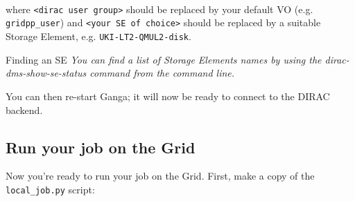 \begin{Shaded}
\begin{Highlighting}[]
\NormalTok{[}\NormalTok{]}
 

\NormalTok{[}\NormalTok{]}
 

\NormalTok{[}\NormalTok{]}
 

\NormalTok{[}\NormalTok{]}
 \NormalTok{= }\KeywordTok{<}\KeywordTok{>}

\NormalTok{[}\NormalTok{]}
 \NormalTok{= }\KeywordTok{<}\KeywordTok{>}
\end{Highlighting}
\end{Shaded}

where \texttt{\textless{}dirac\ user\ group\textgreater{}} should be
replaced by your default VO (e.g. \texttt{gridpp\_user}) and
\texttt{\textless{}your\ SE\ of\ choice\textgreater{}} should be
replaced by a suitable Storage Element, e.g.
\texttt{UKI-LT2-QMUL2-disk}.

\begin{infobox}{Finding an SE}
\emph{You can find a list of Storage Elements names by using the
dirac-dms-show-se-status command from the command line.}
\end{infobox}

You can then re-start Ganga; it will now be ready to connect to the
DIRAC backend.

\subsection{Run your job on the Grid}
\label{run-your-job-on-the-grid}
Now you're ready to run your job on the Grid. First, make a copy of the
\texttt{local\_job.py} script:

\begin{Shaded}
\begin{Highlighting}[]
\NormalTok{$ } 
\NormalTok{$ } 
\NormalTok{$ } 
\end{Highlighting}
\end{Shaded}

